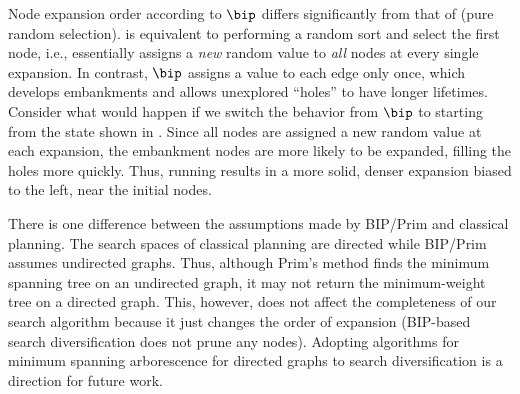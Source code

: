 Node expansion order according to $\bip$ differs  significantly from that of \ro (pure random selection).
% 
\ro is equivalent to performing a random sort and select the first node, i.e., \ro essentially assigns a \emph{new} random value to \emph{all} nodes at every single expansion.
In contrast, $\bip$ assigns a value to each edge only once, which develops embankments and allows unexplored ``holes'' to have longer lifetimes.
% 
% 
Consider what would happen if we switch the behavior from $\bip$ to \ro starting from the state shown in . Since all nodes are assigned a new random value at each expansion, the embankment nodes are more likely to be expanded, filling the holes more quickly. Thus, running \ro results in a more solid, denser expansion biased to the left, near the initial nodes.





There is one difference between the assumptions made by BIP/Prim \cite{barabasi1996invasion} and classical planning.
The search spaces of classical planning are directed while BIP/Prim assumes undirected graphs. Thus, although Prim's method finds the minimum spanning tree on an undirected graph, it may not return the minimum-weight tree on a directed graph. This, however, does not affect the completeness of our search algorithm because it just changes the order of expansion (BIP-based search diversification does not prune any nodes).
% 
% 
Adopting algorithms for minimum spanning arborescence for directed graphs \cite{chu1965shortest,edmonds1967optimum,tarjan1977finding,gabow1986efficient} to search diversification is a direction for future work.%

